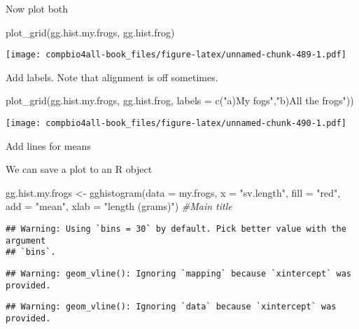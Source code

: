 \documentclass[
]{book}
\newenvironment{Shaded}{\begin{snugshade}}{\end{snugshade}}
\newcommand{\AttributeTok}[1]{\textcolor[rgb]{0.77,0.63,0.00}{#1}}
\newcommand{\CommentTok}[1]{\textcolor[rgb]{0.56,0.35,0.01}{\textit{#1}}}
\newcommand{\FunctionTok}[1]{\textcolor[rgb]{0.00,0.00,0.00}{#1}}
\newcommand{\NormalTok}[1]{#1}
\newcommand{\OtherTok}[1]{\textcolor[rgb]{0.56,0.35,0.01}{#1}}
\newcommand{\StringTok}[1]{\textcolor[rgb]{0.31,0.60,0.02}{#1}}
\begin{document}
Now plot both

\begin{Shaded}
\begin{Highlighting}[]
\FunctionTok{plot\_grid}\NormalTok{(gg.hist.my.frogs,}
\NormalTok{          gg.hist.frog)}
\end{Highlighting}
\end{Shaded}

\texttt{[image: compbio4all-book\_files/figure-latex/unnamed-chunk-489-1.pdf]}

Add labels. Note that alignment is off sometimes.

\begin{Shaded}
\begin{Highlighting}[]
\FunctionTok{plot\_grid}\NormalTok{(gg.hist.my.frogs, }
\NormalTok{          gg.hist.frog,}
          \AttributeTok{labels =} \FunctionTok{c}\NormalTok{(}\StringTok{"a)My fogs"}\NormalTok{,}\StringTok{"b)All the frogs"}\NormalTok{))}
\end{Highlighting}
\end{Shaded}

\texttt{[image: compbio4all-book\_files/figure-latex/unnamed-chunk-490-1.pdf]}

Add lines for means

We can save a plot to an R object

\begin{Shaded}
\begin{Highlighting}[]
\NormalTok{gg.hist.my.frogs }\OtherTok{\textless{}{-}} \FunctionTok{gghistogram}\NormalTok{(}\AttributeTok{data =}\NormalTok{ my.frogs,}
            \AttributeTok{x =} \StringTok{"sv.length"}\NormalTok{,}
            \AttributeTok{fill =} \StringTok{"red"}\NormalTok{,}
            \AttributeTok{add =} \StringTok{"mean"}\NormalTok{,}
            \AttributeTok{xlab =} \StringTok{"length (grams)"}\NormalTok{) }\CommentTok{\#Main title}
\end{Highlighting}
\end{Shaded}

\begin{verbatim}
## Warning: Using `bins = 30` by default. Pick better value with the argument
## `bins`.
\end{verbatim}

\begin{verbatim}
## Warning: geom_vline(): Ignoring `mapping` because `xintercept` was provided.
\end{verbatim}

\begin{verbatim}
## Warning: geom_vline(): Ignoring `data` because `xintercept` was provided.
\end{verbatim}
\end{document}
